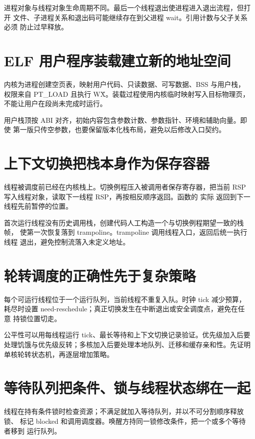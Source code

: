 进程对象与线程对象生命周期不同。最后一个线程退出使进程进入退出流程，但打开
文件、子进程关系和退出码可能继续存在到父进程 wait。引用计数与父子关系必须
防止过早释放。

\section{ELF 用户程序装载建立新的地址空间}

内核为进程创建空页表，映射用户代码、只读数据、可写数据、BSS 与用户栈，
权限来自 PT\_LOAD 且执行 W\^X。装载过程使用内核临时映射写入目标物理页，
不能让用户在段尚未完成时运行。

用户栈顶按 ABI 对齐，初始内容包含参数计数、参数指针、环境和辅助向量。即使
第一版只传空参数，也要保留版本化栈布局，避免以后修改入口契约。

\section{上下文切换把栈本身作为保存容器}

线程被调度前已经在内核栈上。切换例程压入被调用者保存寄存器，把当前 RSP
写入线程对象，读取下一线程 RSP，再按相反顺序返回。函数的  实际
返回到下一线程先前暂停的位置。

首次运行线程没有历史调用栈，创建代码人工构造一个与切换例程期望一致的栈帧，
使第一次恢复落到 trampoline。trampoline 调用线程入口，返回后统一执行线程
退出，避免控制流落入未定义地址。

\section{轮转调度的正确性先于复杂策略}

每个可运行线程位于一个运行队列，当前线程不重复入队。时钟 tick 减少预算，
耗尽时设置 need-reschedule；真正切换发生在中断退出或安全调度点，避免在任意
持锁位置切走。

公平性可以用每线程运行 tick、最长等待和上下文切换记录验证。优先级加入后要
处理饥饿与优先级反转；多核加入后要处理本地队列、迁移和缓存亲和性。先证明
单核轮转状态机，再逐层增加策略。

\section{等待队列把条件、锁与线程状态绑在一起}

线程在持有条件锁时检查资源；不满足就加入等待队列，并以不可分割顺序释放锁、
标记 blocked 和调用调度器。唤醒方持同一锁修改条件，把一个或多个等待者移到
运行队列。

